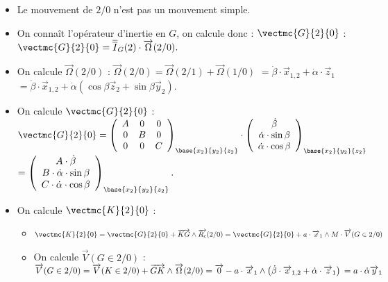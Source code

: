 \begin{multicols}{2}
\ifprof
\begin{corrige}
\begin{itemize}
\item Le mouvement de $2/0$ n'est pas un mouvement simple. 
\item On connaît l'opérateur d'inertie en $G$, on calcule donc : $\vectmc{G}{2}{0}$ :$
\vectmc{G}{2}{0}=\overline{\overline{I}}_G(2)\cdot \overrightarrow{\Omega}(2/0).$

\item On calcule $\overrightarrow{\Omega}(2/0)$ :
$\overrightarrow{\Omega}(2/0)=\overrightarrow{\Omega}(2/1)+\overrightarrow{\Omega}(1/0)$ 
$=\dot{\beta}\cdot \overrightarrow{x}_{1,2}+\dot{\alpha}\cdot \overrightarrow{z}_{1}$
$=\dot{\beta}\cdot \overrightarrow{x}_{1,2}
+\dot{\alpha}\left(\cos\beta\overrightarrow{z}_2+\sin\beta\overrightarrow{y}_2\right)$.

\item On calcule $\vectmc{G}{2}{0}$ : 
$
\vectmc{G}{2}{0}=\left(
\begin{array}{ccc}
A & 0 & 0 \\ 
0 & B & 0 \\ 
0 & 0 & C
\end{array}
\right)_{\base{{x}_2}{{y}_2}{{z}_2}} \cdot 
\left(
\begin{array}{c}
\dot{\beta}\\
\dot{\alpha}\cdot \sin\beta\\
\dot{\alpha}\cdot \cos\beta\\
\end{array}
\right)_{\base{{x}_2}{{y}_2}{{z}_2}}$
$=\left(
\begin{array}{c}
A\cdot \dot{\beta}\\
B\cdot \dot{\alpha}\cdot \sin\beta\\
C\cdot \dot{\alpha}\cdot \cos\beta\\
\end{array}
\right)_{\base{{x}_2}{{y}_2}{{z}_2}}.$

\item On calcule $\vectmc{K}{2}{0}$ : 
\begin{itemize}
\item $\vectmc{K}{2}{0}=\vectmc{G}{2}{0}+\overrightarrow{KG}\wedge \overrightarrow{R_c}(2/0)
=\vectmc{G}{2}{0}+a\cdot \overrightarrow{x}_1\wedge M\cdot \overrightarrow{V}(G\in 2/0)$
\item On calcule $\overrightarrow{V}(G\in 2/0)$ : 
$\overrightarrow{V}(G\in 2/0)=\overrightarrow{V}(K\in 2/0)+\overrightarrow{GK}\wedge \overrightarrow{\Omega}(2/0)=
\overrightarrow{0}-a\cdot \overrightarrow{x}_1\wedge \left(\dot{\beta}\cdot \overrightarrow{x}_{1,2}+\dot{\alpha}\cdot \overrightarrow{z}_{1}\right)\\
=a\cdot \dot{\alpha}\overrightarrow{y}_{1} $


\end{itemize}
\end{itemize}
\end{corrige}
\end{multicols}
